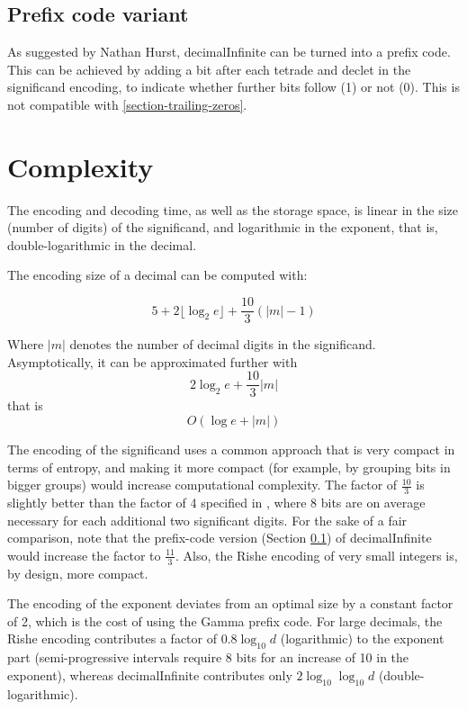 \documentclass{acm_proc_article-sp}
\begin{document}
\subsection{Prefix code variant}
\label{section-prefix-code}

As suggested by Nathan Hurst, decimalInfinite can be turned into a prefix code. This can be achieved by adding a bit after each tetrade and declet in the significand encoding, to indicate whether further bits follow (1) or not (0). This is not compatible with \ref{section-trailing-zeros}.

\section{Complexity}
\label{section-complexity}
The encoding and decoding time, as well as the storage space, is linear in the size (number of digits) of the significand, and logarithmic in the exponent, that is, double-logarithmic in the decimal.

The encoding size of a decimal can be computed with:

$$5 + 2 \lfloor\log_2 e\rfloor + \frac{10}{3} (|m|-1)$$

Where $|m|$ denotes the number of decimal digits in the significand. Asymptotically, it can be approximated further with $$2 \log_2 e + \frac{10}{3}|m|$$ that is $$O(\log e + |m|)$$

The encoding of the significand uses a common approach that is very compact in terms of entropy, and making it more compact (for example, by grouping bits in bigger groups) would increase computational complexity. The factor of $\frac{10}{3}$ is slightly better than the factor of 4 specified in \cite{Rishe1992}, where 8 bits are on average necessary for each additional two significant digits. For the sake of a fair comparison, note that the prefix-code version (Section \ref{section-prefix-code}) of decimalInfinite would increase the factor to $\frac{11}{3}$. Also, the Rishe encoding of very small integers is, by design, more compact.

The encoding of the exponent deviates from an optimal size by a constant factor of 2, which is the cost of using the Gamma prefix code. For large decimals, the Rishe encoding contributes a factor of $0.8 \log_{10} d$ (logarithmic) to the exponent part (semi-progressive intervals require 8 bits for an increase of 10 in the exponent), whereas decimalInfinite contributes only $2 \log_{10}\log_{10} d$ (double-logari\-thmic).
\end{document}
